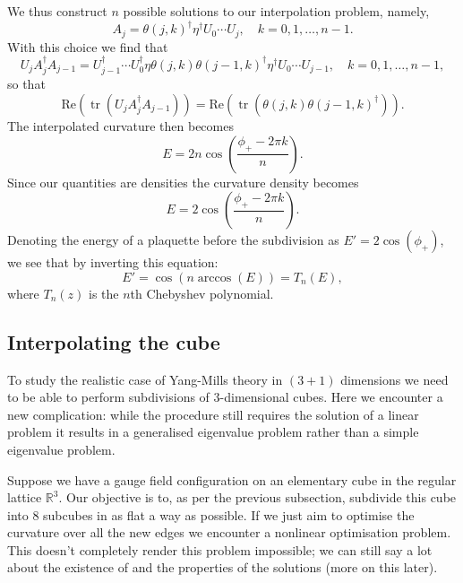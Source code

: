 \documentclass[12pt]{amsart}
\newcommand{\tr}{\operatorname{tr}}
\theoremstyle{definition}
\theoremstyle{remark}
\numberwithin{equation}{section}
\begin{document}
We thus construct $n$ possible solutions to our interpolation problem, namely,
\begin{equation}
	A_j = \theta(j,k)^\dag \eta^\dag U_0 \cdots U_{j}, \quad k = 0, 1, \ldots, n-1.
\end{equation}
With this choice we find that
\begin{equation}
	U_jA_j^\dag A_{j-1} = U_{j-1}^\dag \cdots U_0^\dag  \eta \theta(j,k)\theta(j-1,k)^\dag\eta^\dag U_0 \cdots U_{j-1},  \quad k = 0, 1, \ldots, n-1,
\end{equation}
so that
\begin{equation}
	\text{Re}(\tr(U_jA_j^\dag A_{j-1})) = \text{Re}(\tr(\theta(j,k)\theta(j-1,k)^\dag)).
\end{equation}
The interpolated curvature then becomes
\begin{equation}
	E = 2n \cos\left(\frac{\phi_+ - 2\pi k}{n}\right).
\end{equation}
Since our quantities are densities the curvature density becomes
\begin{equation}
	E = 2 \cos\left(\frac{\phi_+ - 2\pi k}{n}\right).
\end{equation}
Denoting the energy of a plaquette before the subdivision as $E' = 2\cos(\phi_+)$, we see that by inverting this equation:
\begin{equation}
	E' = \cos(n\arccos(E)) = T_n(E),
\end{equation} 
where $T_n(z)$ is the $n$th Chebyshev polynomial.

\subsection{Interpolating the cube}
To study the realistic case of Yang-Mills theory in $(3+1)$ dimensions we need to be able to perform subdivisions of $3$-dimensional cubes. Here we encounter a new complication: while the procedure still requires the solution of a linear problem it results in a generalised eigenvalue problem rather than a simple eigenvalue problem. 

Suppose we have a gauge field configuration on an elementary cube in the regular lattice $\mathbb{R}^3$. Our objective is to, as per the previous subsection, subdivide this cube into $8$ subcubes in as flat a way as possible. If we just aim to optimise the curvature over all the new edges we encounter a nonlinear optimisation problem. This doesn't completely render this problem impossible; we can still say a lot about the existence of and the properties of the solutions (more on this later).
\end{document}
